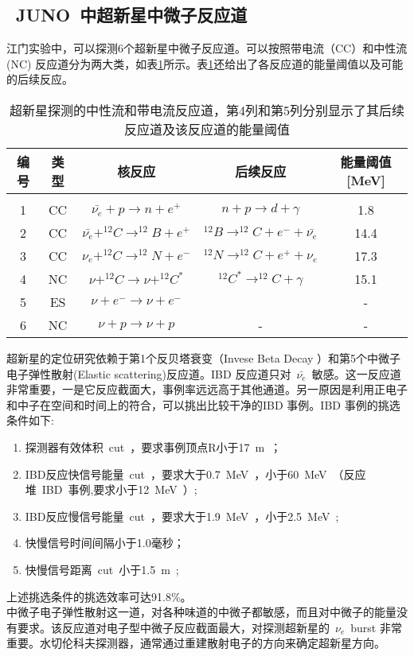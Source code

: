 \subsection{~JUNO~中超新星中微子反应道}
江门实验中，可以探测6个超新星中微子反应道。可以按照带电流（CC）和中性流(NC) 反应道分为两大类，如表\ref{tab:t61}所示。表\ref{tab:t61}还给出了各反应道的能量阈值以及可能的后续反应。
\begin{table}[htb]
\centering  %
\begin{tabular}{ccccc}  %
\hline
 编号&类型 &核反应 &后续反应 &能量阈值[MeV] \\ \hline  %
\\   1& CC & $ \bar{\nu_{e}}  + p \rightarrow n + e^{+} $  & $ n+p \rightarrow d + \gamma $ &1.8%
\\   2& CC& $ \bar{\nu_{e}}   +^{12}C \rightarrow ^{12}B+e^{+} $ & $^{12}B\rightarrow^{12}C+e^{-}+ \bar{\nu_{e}}$ &14.4%
\\   3&CC & $ \nu_{e}+^{12}C \rightarrow ^{12}N+e^{-}$ &  $^{12}N\rightarrow^{12}C+e^{+}+ \nu_{e}$   &17.3%
\\   4& NC&$\nu+^{12}C \rightarrow \nu+ ^{12}C^{*}$ &  $^{12}C^{*}\rightarrow^{12}C+\gamma  $&15.1%
\\   5& ES&$\nu+e^{-} \rightarrow \nu+e^{-}$& \text{-} &-%
\\   6& NC& $\nu+p \rightarrow \nu+p $ & - &-%
\\ \hline
\end{tabular}
\caption{超新星探测的中性流和带电流反应道，第4列和第5列分别显示了其后续反应道及该反应道的能量阈值}
\label{tab:t61}
\end{table}
超新星的定位研究依赖于第1个反贝塔衰变（Invese Beta Decay ）和第5个中微子电子弹性散射(Elastic scattering)反应道。IBD 反应道只对~$\bar{\nu_{e}}$~敏感。这一反应道非常重要，一是它反应截面大，事例率远远高于其他通道。另一原因是利用正电子和中子在空间和时间上的符合，可以挑出比较干净的IBD 事例。IBD 事例的挑选条件如下\citep{an2015neutrino}:
\begin{enumerate}
\item 探测器有效体积~cut~，要求事例顶点R小于17~m~；
\item IBD反应快信号能量~cut~，要求大于0.7~MeV~，小于60~MeV~（反应堆~IBD~事例,要求小于12~MeV~）;
\item IBD反应慢信号能量~cut~，要求大于1.9~MeV~，小于2.5~MeV~;
\item 快慢信号时间间隔小于1.0毫秒；
\item 快慢信号距离~cut~小于1.5~m~;
\end{enumerate}
上述挑选条件的挑选效率可达91.8\%。\\
中微子电子弹性散射这一道，对各种味道的中微子都敏感，而且对中微子的能量没有要求。该反应道对电子型中微子反应截面最大，对探测超新星的~$\nu_e$~burst 非常重要。水切伦科夫探测器，通常通过重建散射电子的方向来确定超新星方向。


